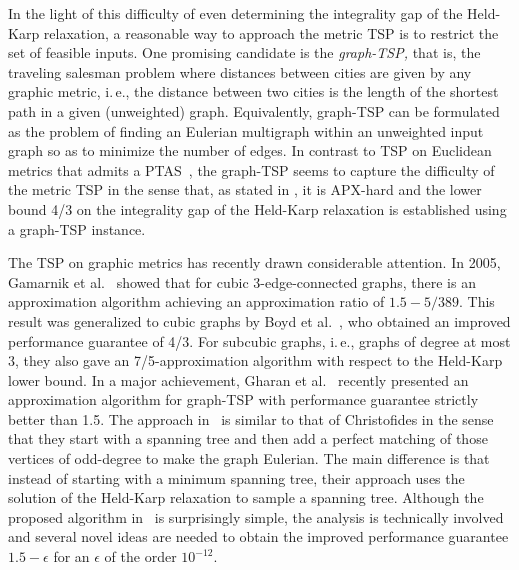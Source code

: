 \documentclass[letterpaper,11pt]{article}
\newcommand{\TSP}{graph-TSP\xspace}
\begin{document}
    In the light of this difficulty of even determining the integrality gap of
    the Held-Karp relaxation, a reasonable way to approach the metric TSP
    is to restrict the set of feasible inputs. One promising candidate is
    the \emph{\TSP,} that is, the traveling salesman problem where
    distances between cities are given by any graphic metric, i.\,e., the
    distance between two cities is the length of the shortest path in a
    given (unweighted) graph. Equivalently, \TSP can be formulated as the
    problem of finding an Eulerian multigraph within an unweighted input
    graph so as to minimize the number of edges. In contrast to TSP on
    Euclidean metrics that admits a PTAS~\cite{Arora98,Mitch99}, the \TSP
    seems to capture the difficulty of the metric TSP in the sense that,
    as stated in \cite{GKP95}, it is APX-hard and the lower bound 4/3 on
    the integrality gap of the Held-Karp relaxation is established using a
    \TSP instance.

    The TSP on graphic metrics has recently drawn considerable attention.
    In 2005, Gamarnik et al.~\cite{GLS05} showed that for cubic
    3-edge-connected graphs, there is an approximation algorithm achieving
    an approximation ratio of $1.5-5/389$. This result was generalized to
    cubic graphs by Boyd et al.~\cite{BSSS11}, who obtained an improved
    performance guarantee of 4/3.  For subcubic graphs, i.\,e., graphs of
    degree at most $3$, they also gave an 7/5-approximation algorithm with
    respect to the Held-Karp lower bound.  In a major achievement, Gharan
    et al.~\cite{GSS11} recently presented an approximation algorithm for
    \TSP with performance guarantee strictly better than 1.5. The approach
    in~\cite{GSS11} is similar to that of Christofides in the sense that
    they start with a spanning tree and then add a perfect matching of
    those vertices of odd-degree to make the graph Eulerian. The main
    difference is that instead of starting with a minimum spanning tree,
    their approach uses the solution of the Held-Karp relaxation to sample
    a spanning tree. Although the proposed algorithm in~\cite{GSS11} is
    surprisingly simple, the analysis is technically involved and several novel
    ideas are needed to obtain the improved performance guarantee
    $1.5-\epsilon$ for an $\epsilon$ of the order $10^{-12}$.
\end{document}
